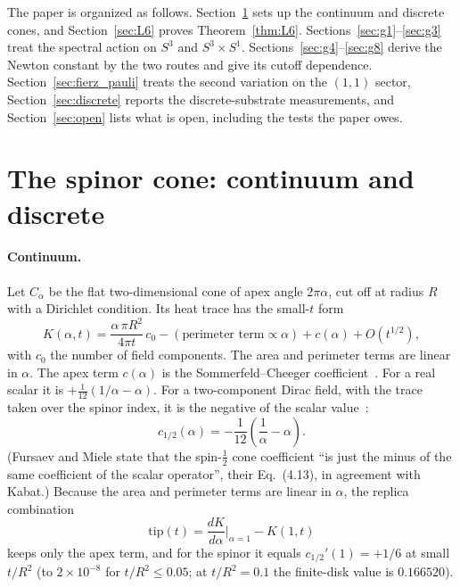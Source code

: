 \documentclass[11pt,a4paper]{article}
\theoremstyle{plain}
\theoremstyle{definition}
\newcommand{\sthree}{S^{3}}
\renewcommand{\_}{\textunderscore\allowbreak}
\begin{document}
The paper is organized as follows. Section~\ref{sec:cone} sets up the
continuum and discrete cones, and Section~\ref{sec:L6} proves
Theorem~\ref{thm:L6}. Sections~\ref{sec:g1}--\ref{sec:g3} treat the
spectral action on $\sthree$ and $\sthree \times S^1$.
Sections~\ref{sec:g4}--\ref{sec:g8} derive the Newton constant by the two
routes and give its cutoff dependence. Section~\ref{sec:fierz_pauli}
treats the second variation on the $(1,1)$ sector,
Section~\ref{sec:discrete} reports the discrete-substrate measurements,
and Section~\ref{sec:open} lists what is open, including the tests the
paper owes.

\section{The spinor cone: continuum and discrete}
\label{sec:cone}

\paragraph{Continuum.} Let $C_\alpha$ be the flat two-dimensional cone
of apex angle $2\pi\alpha$, cut off at radius $R$ with a Dirichlet
condition. Its heat trace has the small-$t$ form
\begin{equation}
  K(\alpha, t) = \frac{\alpha\,\pi R^2}{4\pi t}\,c_0
               - (\text{perimeter term} \propto \alpha)
               + c(\alpha) + O(t^{1/2}),
\end{equation}
with $c_0$ the number of field components. The area and perimeter terms
are linear in $\alpha$. The apex term $c(\alpha)$ is the
Sommerfeld--Cheeger coefficient~\cite{sommerfeld1894, dowker1977,
cheeger1983}. For a real scalar it is $+\tfrac{1}{12}(1/\alpha - \alpha)$.
For a two-component Dirac field, with the trace taken over the spinor
index, it is the negative of the scalar value~\cite{kabat1995,
fursaev_miele1996}:
\begin{equation}
  c_{1/2}(\alpha) = -\frac{1}{12}\!\left(\frac{1}{\alpha} - \alpha\right).
  \label{eq:spinor_sc_tip}
\end{equation}
(Fursaev and Miele state that the spin-$\tfrac12$ cone coefficient ``is
just the minus of the same coefficient of the scalar operator'', their
Eq.~(4.13), in agreement with Kabat.) Because the area and perimeter terms
are linear in $\alpha$, the replica combination
\begin{equation}
  \mathrm{tip}(t) = \frac{dK}{d\alpha}\bigg|_{\alpha=1} - K(1, t)
  \label{eq:tip_def}
\end{equation}
keeps only the apex term, and for the spinor it equals
$c_{1/2}'(1) = +1/6$ at small $t/R^2$ (to $2\times10^{-8}$ for
$t/R^2 \le 0.05$; at $t/R^2 = 0.1$ the finite-disk value is $0.166520$).
\end{document}
